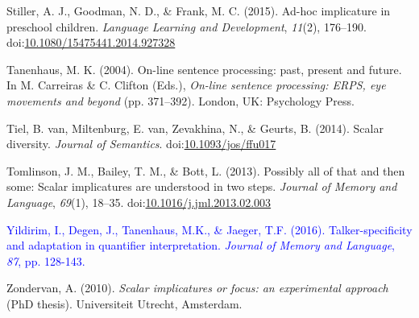 \documentclass[man]{apa6}
\newcommand{\change}[1]{\textcolor{Blue}{#1}}
\theoremstyle{definition}
\theoremstyle{definition}
\theoremstyle{definition}
\theoremstyle{remark}
\begin{document}
\hypertarget{ref-Stiller2015}{}
Stiller, A. J., Goodman, N. D., \& Frank, M. C. (2015). Ad-hoc
implicature in preschool children. \emph{Language Learning and
Development}, \emph{11}(2), 176--190.
doi:\href{https://doi.org/10.1080/15475441.2014.927328}{10.1080/15475441.2014.927328}

\hypertarget{ref-Tanenhaus2004}{}
Tanenhaus, M. K. (2004). On-line sentence processing: past, present and
future. In M. Carreiras \& C. Clifton (Eds.), \emph{On-line sentence
processing: ERPS, eye movements and beyond} (pp. 371--392). London, UK:
Psychology Press.

\hypertarget{ref-VanTiel2014}{}
Tiel, B. van, Miltenburg, E. van, Zevakhina, N., \& Geurts, B. (2014).
Scalar diversity. \emph{Journal of Semantics}.
doi:\href{https://doi.org/10.1093/jos/ffu017}{10.1093/jos/ffu017}

\hypertarget{ref-Tomlinson2013}{}
Tomlinson, J. M., Bailey, T. M., \& Bott, L. (2013). Possibly all of
that and then some: Scalar implicatures are understood in two steps.
\emph{Journal of Memory and Language}, \emph{69}(1), 18--35.
doi:\href{https://doi.org/10.1016/j.jml.2013.02.003}{10.1016/j.jml.2013.02.003}

\change{\hypertarget{ref-Yildirim2016}{}
Yildirim, I., Degen, J., Tanenhaus, M.K., \& Jaeger, T.F. (2016). Talker-specificity and adaptation in quantifier interpretation. \emph{Journal of Memory and Language}, \emph{87}, pp. 128-143.}


\hypertarget{ref-Zondervan2010}{}
Zondervan, A. (2010). \emph{Scalar implicatures or focus: an
experimental approach} (PhD thesis). Universiteit Utrecht, Amsterdam.
\end{document}

